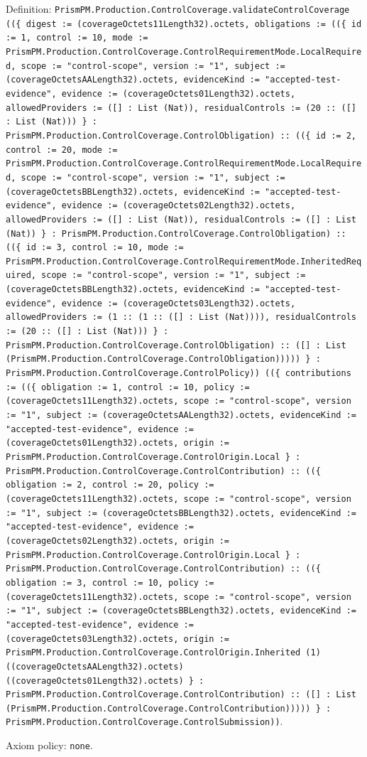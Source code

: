 \documentclass[11pt]{article}
\begin{document}
\noindent Definition: \texttt{PrismPM.Production.ControlCoverage.validateControlCoverage ((\{ digest := (coverageOctets11Length32).octets, obligations := ((\{ id := 1, control := 10, mode := PrismPM.Production.ControlCoverage.ControlRequirementMode.LocalRequired, scope := "control-scope", version := "1", subject := (coverageOctetsAALength32).octets, evidenceKind := "accepted-test-evidence", evidence := (coverageOctets01Length32).octets, allowedProviders := ([] : List (Nat)), residualControls := (20 :: ([] : List (Nat))) \} : PrismPM.Production.ControlCoverage.ControlObligation) :: ((\{ id := 2, control := 20, mode := PrismPM.Production.ControlCoverage.ControlRequirementMode.LocalRequired, scope := "control-scope", version := "1", subject := (coverageOctetsBBLength32).octets, evidenceKind := "accepted-test-evidence", evidence := (coverageOctets02Length32).octets, allowedProviders := ([] : List (Nat)), residualControls := ([] : List (Nat)) \} : PrismPM.Production.ControlCoverage.ControlObligation) :: ((\{ id := 3, control := 10, mode := PrismPM.Production.ControlCoverage.ControlRequirementMode.InheritedRequired, scope := "control-scope", version := "1", subject := (coverageOctetsBBLength32).octets, evidenceKind := "accepted-test-evidence", evidence := (coverageOctets03Length32).octets, allowedProviders := (1 :: (1 :: ([] : List (Nat)))), residualControls := (20 :: ([] : List (Nat))) \} : PrismPM.Production.ControlCoverage.ControlObligation) :: ([] : List (PrismPM.Production.ControlCoverage.ControlObligation))))) \} : PrismPM.Production.ControlCoverage.ControlPolicy)) ((\{ contributions := ((\{ obligation := 1, control := 10, policy := (coverageOctets11Length32).octets, scope := "control-scope", version := "1", subject := (coverageOctetsAALength32).octets, evidenceKind := "accepted-test-evidence", evidence := (coverageOctets01Length32).octets, origin := PrismPM.Production.ControlCoverage.ControlOrigin.Local \} : PrismPM.Production.ControlCoverage.ControlContribution) :: ((\{ obligation := 2, control := 20, policy := (coverageOctets11Length32).octets, scope := "control-scope", version := "1", subject := (coverageOctetsBBLength32).octets, evidenceKind := "accepted-test-evidence", evidence := (coverageOctets02Length32).octets, origin := PrismPM.Production.ControlCoverage.ControlOrigin.Local \} : PrismPM.Production.ControlCoverage.ControlContribution) :: ((\{ obligation := 3, control := 10, policy := (coverageOctets11Length32).octets, scope := "control-scope", version := "1", subject := (coverageOctetsBBLength32).octets, evidenceKind := "accepted-test-evidence", evidence := (coverageOctets03Length32).octets, origin := PrismPM.Production.ControlCoverage.ControlOrigin.Inherited (1) ((coverageOctetsAALength32).octets) ((coverageOctets01Length32).octets) \} : PrismPM.Production.ControlCoverage.ControlContribution) :: ([] : List (PrismPM.Production.ControlCoverage.ControlContribution))))) \} : PrismPM.Production.ControlCoverage.ControlSubmission))}.\par
\noindent Axiom policy: \texttt{none}.\par
\end{document}
